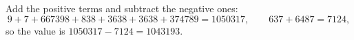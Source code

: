 Add the positive terms and subtract the negative ones:
\[9+7+667398+838+3638+3638+374789=1050317,\qquad 637+6487=7124,\]
so the value is $1050317-7124=\boxed{1043193}$.
